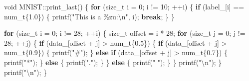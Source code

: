 \documentclass[
]{article}
\newenvironment{Shaded}{}{}
\newcommand{\ControlFlowTok}[1]{\textcolor[rgb]{0.00,0.44,0.13}{\textbf{#1}}}
\newcommand{\DataTypeTok}[1]{\textcolor[rgb]{0.56,0.13,0.00}{#1}}
\newcommand{\DecValTok}[1]{\textcolor[rgb]{0.25,0.63,0.44}{#1}}
\newcommand{\FloatTok}[1]{\textcolor[rgb]{0.25,0.63,0.44}{#1}}
\newcommand{\NormalTok}[1]{#1}
\newcommand{\SpecialCharTok}[1]{\textcolor[rgb]{0.25,0.44,0.63}{#1}}
\newcommand{\StringTok}[1]{\textcolor[rgb]{0.25,0.44,0.63}{#1}}
\newcommand{\VariableTok}[1]{\textcolor[rgb]{0.10,0.09,0.49}{#1}}
\begin{document}
\begin{Shaded}
\begin{Highlighting}[]
\DataTypeTok{void}\NormalTok{ MNIST::print\_last()}
\NormalTok{\{}
    \ControlFlowTok{for}\NormalTok{ (}\DataTypeTok{size\_t}\NormalTok{ i = }\DecValTok{0}\NormalTok{; i != }\DecValTok{10}\NormalTok{; ++i)}
\NormalTok{    \{}
        \ControlFlowTok{if}\NormalTok{ (}\VariableTok{label\_}\NormalTok{[i] == }\DataTypeTok{num\_t}\NormalTok{\{}\FloatTok{1.0}\NormalTok{\})}
\NormalTok{        \{}
\NormalTok{            printf(}\StringTok{"This is a }\SpecialCharTok{\%zu}\StringTok{:}\SpecialCharTok{\textbackslash{}n}\StringTok{"}\NormalTok{, i);}
            \ControlFlowTok{break}\NormalTok{;}
\NormalTok{        \}}
\NormalTok{    \}}

    \ControlFlowTok{for}\NormalTok{ (}\DataTypeTok{size\_t}\NormalTok{ i = }\DecValTok{0}\NormalTok{; i != }\DecValTok{28}\NormalTok{; ++i)}
\NormalTok{    \{}
        \DataTypeTok{size\_t}\NormalTok{ offset = i * }\DecValTok{28}\NormalTok{;}
        \ControlFlowTok{for}\NormalTok{ (}\DataTypeTok{size\_t}\NormalTok{ j = }\DecValTok{0}\NormalTok{; j != }\DecValTok{28}\NormalTok{; ++j)}
\NormalTok{        \{}
            \ControlFlowTok{if}\NormalTok{ (}\VariableTok{data\_}\NormalTok{[offset + j] \textgreater{} }\DataTypeTok{num\_t}\NormalTok{\{}\FloatTok{0.5}\NormalTok{\})}
\NormalTok{            \{}
                \ControlFlowTok{if}\NormalTok{ (}\VariableTok{data\_}\NormalTok{[offset + j] \textgreater{} }\DataTypeTok{num\_t}\NormalTok{\{}\FloatTok{0.9}\NormalTok{\})}
\NormalTok{                \{}
\NormalTok{                    printf(}\StringTok{"\#"}\NormalTok{);}
\NormalTok{                \}}
                \ControlFlowTok{else} \ControlFlowTok{if}\NormalTok{ (}\VariableTok{data\_}\NormalTok{[offset + j] \textgreater{} }\DataTypeTok{num\_t}\NormalTok{\{}\FloatTok{0.7}\NormalTok{\})}
\NormalTok{                \{}
\NormalTok{                    printf(}\StringTok{"*"}\NormalTok{);}
\NormalTok{                \}}
                \ControlFlowTok{else}
\NormalTok{                \{}
\NormalTok{                    printf(}\StringTok{"."}\NormalTok{);}
\NormalTok{                \}}
\NormalTok{            \}}
            \ControlFlowTok{else}
\NormalTok{            \{}
\NormalTok{                printf(}\StringTok{" "}\NormalTok{);}
\NormalTok{            \}}
\NormalTok{        \}}
\NormalTok{        printf(}\StringTok{"}\SpecialCharTok{\textbackslash{}n}\StringTok{"}\NormalTok{);}
\NormalTok{    \}}
\NormalTok{    printf(}\StringTok{"}\SpecialCharTok{\textbackslash{}n}\StringTok{"}\NormalTok{);}
\NormalTok{\}}
\end{Highlighting}
\end{Shaded}
\end{document}
